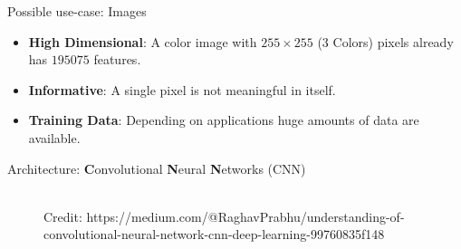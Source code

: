 \begin{frame} {Possible use-case: Images}
\begin{itemize}
\item \textbf{High Dimensional}: A color image with $255 \times 255$ (3 Colors) pixels already has $195075$ features.
\vspace{.1cm}
\item \textbf{Informative}: A single pixel is not meaningful in itself.
\vspace{.1cm}
\item \textbf{Training Data}: Depending on applications huge amounts of data are available.
\end{itemize}
\vspace{.3cm}
Architecture: \textbf{C}onvolutional \textbf{N}eural \textbf{N}etworks (CNN)
\begin{figure}
\centering
{}
\\
\tiny{Credit: https://medium.com/@RaghavPrabhu/understanding-of-convolutional-neural-network-cnn-deep-learning-99760835f148}
\end{figure}
\end{frame}

